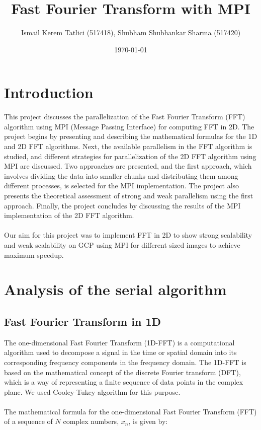 \documentclass{article}
\begin{document}
\title{\textbf{Fast Fourier Transform with MPI}}
\author{Ismail Kerem Tatlici (517418), Shubham Shubhankar Sharma (517420)}
\date{\today}
\maketitle
\section{Introduction}

This project discusses the parallelization of the Fast Fourier Transform (FFT)\cite{fft_wikipedia} algorithm using MPI (Message Passing Interface) for computing FFT in  2D. The project begins by presenting and describing the mathematical formulas for the 1D and 2D FFT algorithms. Next, the available parallelism in the FFT algorithm is studied, and different strategies for parallelization of the 2D FFT algorithm using MPI are discussed. Two approaches are presented, and the first approach, which involves dividing the data into smaller chunks and distributing them among different processes, is selected for the MPI implementation. The project also presents the theoretical assessment of strong and weak parallelism using the first approach. Finally, the project concludes by discussing the results of the MPI implementation of the 2D FFT algorithm.
\\\\
Our aim for this project was to implement FFT in 2D to show strong scalability and weak scalability on GCP using MPI for different sized images to achieve maximum speedup.

\section{Analysis of the serial algorithm}
\subsection{Fast Fourier Transform in 1D}
The one-dimensional Fast Fourier Transform (1D-FFT)\cite{fft_video} is a computational algorithm used to decompose a signal in the time or spatial domain into its corresponding frequency components in the frequency domain. The 1D-FFT is based on the mathematical concept of the discrete Fourier transform (DFT), which is a way of representing a finite sequence of data points in the complex plane. We used Cooley-Tukey algorithm\cite{cooley1965algorithm} for this purpose.
\\\\
The mathematical formula for the one-dimensional Fast Fourier Transform (FFT) of a sequence of $N$ complex numbers, $x_n$, is given by:
\end{document}
